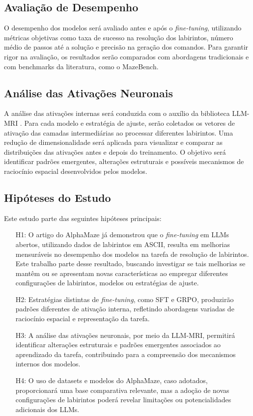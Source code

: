 \subsection{Avaliação de Desempenho}

O desempenho dos modelos será avaliado antes e após o \textit{fine-tuning}, utilizando métricas objetivas como taxa de sucesso na resolução dos labirintos, número médio de passos até a solução e precisão na geração dos comandos. Para garantir rigor na avaliação, os resultados serão comparados com abordagens tradicionais e com benchmarks da literatura, como o MazeBench.

\subsection{Análise das Ativações Neuronais}

A análise das ativações internas será conduzida com o auxílio da biblioteca LLM-MRI \cite{costa2024llmmri}. Para cada modelo e estratégia de ajuste, serão coletados os vetores de ativação das camadas intermediárias ao processar diferentes labirintos. Uma redução de dimensionalidade será aplicada para visualizar e comparar as distribuições das ativações antes e depois do treinamento. O objetivo será identificar padrões emergentes, alterações estruturais e possíveis mecanismos de raciocínio espacial desenvolvidos pelos modelos.

\subsection{Hipóteses do Estudo}

Este estudo parte das seguintes hipóteses principais:
\begin{itemize}
    \item[H1:] O artigo do AlphaMaze já demonstrou que o \textit{fine-tuning} em LLMs abertos, utilizando dados de labirintos em ASCII, resulta em melhorias mensuráveis no desempenho dos modelos na tarefa de resolução de labirintos. Este trabalho parte desse resultado, buscando investigar se tais melhorias se mantêm ou se apresentam novas características ao empregar diferentes configurações de labirintos, modelos ou estratégias de ajuste.
    \item[H2:] Estratégias distintas de \textit{fine-tuning}, como SFT e GRPO, produzirão padrões diferentes de ativação interna, refletindo abordagens variadas de raciocínio espacial e representação da tarefa.
    \item[H3:] A análise das ativações neuronais, por meio da LLM-MRI, permitirá identificar alterações estruturais e padrões emergentes associados ao aprendizado da tarefa, contribuindo para a compreensão dos mecanismos internos dos modelos.
    \item[H4:] O uso de datasets e modelos do AlphaMaze, caso adotados, proporcionará uma base comparativa relevante, mas a adoção de novas configurações de labirintos poderá revelar limitações ou potencialidades adicionais dos LLMs.
\end{itemize}

